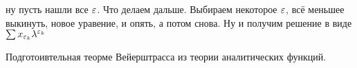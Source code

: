 ну пусть нашли все ${\varepsilon}$. Что делаем дальше. Выбираем некоторое ${\varepsilon}$, всё меньшее выкинуть, новое уравение, и опять, а потом снова. Ну и получим решение в виде $\sum x_{{\varepsilon}_k}\lambda^{{\varepsilon}_k}$

Подготоивтельная теорме Вейерштрасса из теории аналитических функций.